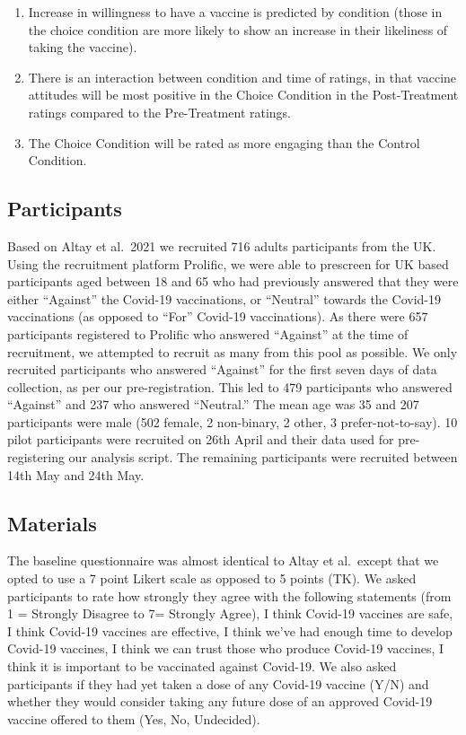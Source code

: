 \documentclass[
  english,
  ,jou,floatsintext]{apa6}
\begin{document}
\begin{enumerate}
\def\labelenumi{\arabic{enumi})}
\item
  Increase in willingness to have a vaccine is predicted by condition (those in the choice condition are more likely to show an increase in their likeliness of taking the vaccine).
\item
  There is an interaction between condition and time of ratings, in that vaccine attitudes will be most positive in the Choice Condition in the Post-Treatment ratings compared to the Pre-Treatment ratings.
\item
  The Choice Condition will be rated as more engaging than the Control Condition.
\end{enumerate}

\hypertarget{participants}{%
\subsection{Participants}\label{participants}}

Based on Altay et al.~2021 we recruited 716 adults participants from the UK. Using the recruitment platform Prolific, we were able to prescreen for UK based participants aged between 18 and 65 who had previously answered that they were either ``Against'' the Covid-19 vaccinations, or ``Neutral'' towards the Covid-19 vaccinations (as opposed to ``For'' Covid-19 vaccinations). As there were 657 participants registered to Prolific who answered ``Against'' at the time of recruitment, we attempted to recruit as many from this pool as possible. We only recruited participants who answered ``Against'' for the first seven days of data collection, as per our pre-registration. This led to 479 participants who answered ``Against'' and 237 who answered ``Neutral.'' The mean age was 35 and 207 participants were male (502 female, 2 non-binary, 2 other, 3 prefer-not-to-say). 10 pilot participants were recruited on 26th April and their data used for pre-registering our analysis script. The remaining participants were recruited between 14th May and 24th May.

\hypertarget{materials}{%
\subsection{Materials}\label{materials}}

The baseline questionnaire was almost identical to Altay et al.~except that we opted to use a 7 point Likert scale as opposed to 5 points (TK). We asked participants to rate how strongly they agree with the following statements (from 1 = Strongly Disagree to 7= Strongly Agree), I think Covid-19 vaccines are safe, I think Covid-19 vaccines are effective, I think we've had enough time to develop Covid-19 vaccines, I think we can trust those who produce Covid-19 vaccines, I think it is important to be vaccinated against Covid-19. We also asked participants if they had yet taken a dose of any Covid-19 vaccine (Y/N) and whether they would consider taking any future dose of an approved Covid-19 vaccine offered to them (Yes, No, Undecided).
\end{document}
